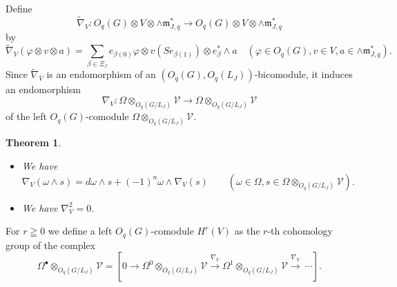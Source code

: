 \documentclass[a4paper, 12pt, leqno]{amsart}
\newtheorem{theorem}[lemma]{{\sc Theorem}}
\theoremstyle{definition}
\numberwithin{equation}{section}
\def\Gm{{\mathfrak{m}}}
\def\CV{{\mathcal V}}
\def\m{\Gm_{J,q}}
\def\F{O_q(G/L_J)}
\begin{document}
Define
\[
\tilde{\nabla}_V:O_q(G)\otimes V\otimes \wedge\m^*
\to O_q(G)\otimes V\otimes \wedge\m^*
\]
by
\[
\tilde{\nabla}_V(\varphi\otimes v\otimes a)
=
\sum_{\beta\in\Xi_J}
e_{\beta(0)}\varphi\otimes v(Se_{\beta(1)})\otimes e^*_\beta\wedge a
\quad
(\varphi\in O_q(G), v\in V, a\in\wedge\m^*).
\]
Since $\tilde{\nabla}_V$ is an endomorphism of an $(O_q(G),O_q(L_J))$-bicomodule, it induces an endomorphism
\[
\nabla_V:\Omega\otimes_{\F}\CV\to\Omega\otimes_{\F}\CV
\]
of the left $O_q(G)$-comodule $\Omega\otimes_{\F}\CV$.
\begin{theorem}
\begin{itemize}
\item[(i)]
We have
\[
\nabla_V(\omega\wedge s)=d\omega\wedge s+(-1)^n\omega\wedge\nabla_V(s)
\qquad(
\omega\in\Omega, s\in \Omega\otimes_{\F}\CV).
\]
\item[(ii)] We have $\nabla_V^2=0$.
\end{itemize}
\end{theorem}

For $r\geqq0$ we define a left $O_q(G)$-comodule
 $H^r(V)$ as the $r$-th cohomology group of the
complex
\[
\Omega^\bullet\otimes_{\F}\CV
=
[
0\to \Omega^0\otimes_{\F}\CV\xrightarrow{\nabla_V}\Omega^1\otimes_{\F}\CV\xrightarrow{\nabla_V}\
\cdots].
\]
\end{document}
